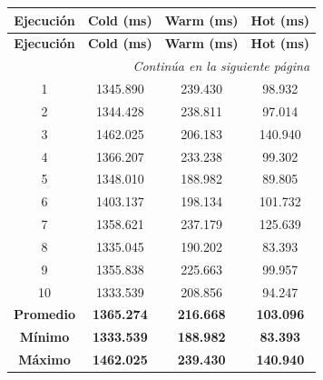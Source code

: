 \begin{longtable}{@{}cccc@{}}

\toprule
\textbf{Ejecución} &
\textbf{Cold (ms)} &
\textbf{Warm (ms)} &
\textbf{Hot (ms)} \\
\toprule
\endfirsthead

\toprule
\textbf{Ejecución} &
\textbf{Cold (ms)} &
\textbf{Warm (ms)} &
\textbf{Hot (ms)} \\
\toprule
\endhead

\midrule[\heavyrulewidth]
\multicolumn{4}{r}{\textit{Continúa en la siguiente página}}\\
\endfoot

\bottomrule
\endlastfoot

1  & 1345.890 & 239.430 & 98.932 \\
2  & 1344.428 & 238.811 & 97.014 \\
3  & 1462.025 & 206.183 & 140.940 \\
4  & 1366.207 & 233.238 & 99.302 \\
5  & 1348.010 & 188.982 & 89.805 \\
6  & 1403.137 & 198.134 & 101.732 \\
7  & 1358.621 & 237.179 & 125.639 \\
8  & 1335.045 & 190.202 & 83.393 \\
9  & 1355.838 & 225.663 & 99.957 \\
10 & 1333.539 & 208.856 & 94.247 \\

\midrule

\textbf{Promedio} & \textbf{1365.274} & \textbf{216.668} & \textbf{103.096} \\
\textbf{Mínimo}   & \textbf{1333.539} & \textbf{188.982} & \textbf{83.393} \\
\textbf{Máximo}   & \textbf{1462.025} & \textbf{239.430} & \textbf{140.940} \\

\end{longtable}